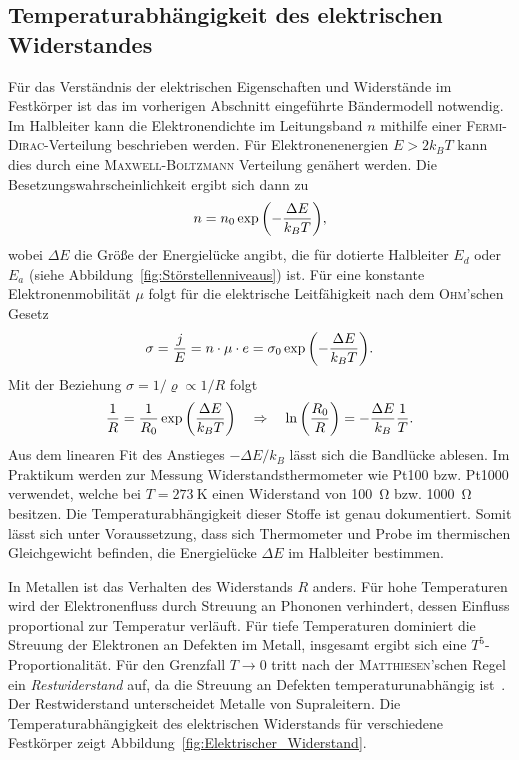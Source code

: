 \documentclass[parskip=half, a4paper,twoside,final]{article}
\begin{document}
\subsection{Temperaturabhängigkeit des elektrischen Widerstandes}\label{sec:Widerstand}
Für das Verständnis der elektrischen Eigenschaften und Widerstände im Festkörper ist das im vorherigen Abschnitt eingeführte Bändermodell notwendig. Im Halbleiter kann die Elektronendichte im Leitungsband $n$ mithilfe einer \textsc{Fermi-Dirac}-Verteilung beschrieben werden. Für Elektronenenergien $E > 2k_B T$ kann dies durch eine \textsc{Maxwell-Boltzmann} Verteilung genähert werden. Die Besetzungswahrscheinlichkeit ergibt sich dann zu~\cite{Thurk}
\begin{align}
  n = n_0 \exp\qty(-\frac{\Delta E}{k_B T}),
\end{align}
wobei $\Delta E$ die Größe der Energielücke angibt, die für dotierte Halbleiter $E_d$ oder $E_a$ (siehe Abbildung~\ref{fig:Störstellenniveaus}) ist.
Für eine konstante Elektronenmobilität $\mu$ folgt für die elektrische Leitfähigkeit nach dem \textsc{Ohm}'schen Gesetz~\cite{Thurk}
\begin{align}
  \sigma = \frac{j}{E} = n \cdot \mu \cdot e = \sigma_0 \exp\qty(-\frac{\Delta E}{k_B T}).
\end{align}
Mit der Beziehung $\sigma = 1/\varrho \propto 1/R$ folgt
\begin{align}\label{eqn:Anstieg_Bandlücke}
  \frac{1}{R} = \frac{1}{R_0} \exp\qty(\frac{\Delta E}{k_B T}) \quad \Rightarrow \quad \ln\qty(\frac{R_0}{R}) = -\frac{\Delta E}{k_B}\frac{1}{T}.
\end{align}
Aus dem linearen Fit des Anstieges $-\Delta E/k_B$ lässt sich die Bandlücke ablesen. Im Praktikum werden zur Messung Widerstandsthermometer wie Pt100 bzw. Pt1000 verwendet, welche bei $T = \SI{273}{\kelvin}$ einen Widerstand von \SI{100}{\ohm} bzw. \SI{1000}{\ohm} besitzen. Die Temperaturabhängigkeit dieser Stoffe ist genau dokumentiert. Somit lässt sich unter Voraussetzung, dass sich Thermometer und Probe im thermischen Gleichgewicht befinden, die Energielücke $\Delta E$ im Halbleiter bestimmen.

In Metallen ist das Verhalten des Widerstands $R$ anders. Für hohe Temperaturen wird der Elektronenfluss durch Streuung an Phononen verhindert, dessen Einfluss proportional zur Temperatur verläuft. Für tiefe Temperaturen dominiert die Streuung der Elektronen an Defekten im Metall, insgesamt ergibt sich eine $T^5$-Proportionalität. Für den Grenzfall $T \to 0$ tritt nach der \textsc{Matthiesen}'schen Regel ein \emph{Restwiderstand} auf, da die Streuung an Defekten temperaturunabhängig ist~\cite{Hunklinger}. Der Restwiderstand unterscheidet Metalle von Supraleitern. Die Temperaturabhängigkeit des elektrischen Widerstands für verschiedene Festkörper zeigt Abbildung~\ref{fig:Elektrischer_Widerstand}.
\end{document}
